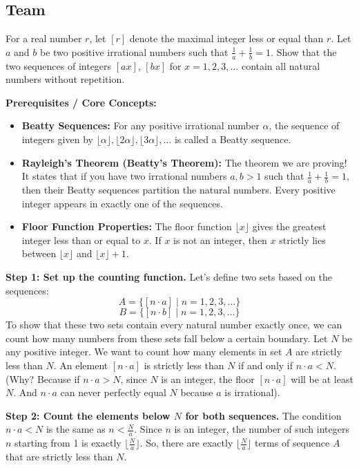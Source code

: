 \subsection*{Team}
\begin{exercise}
\label{algebra:2010:7}
For a real number $r$, let $[r]$ denote the maximal integer less or equal than $r$. Let $a$ and $b$ be two positive irrational numbers such that $\frac{1}{a} + \frac{1}{b} = 1$. Show that the two sequences of integers $[ax]$, $[bx]$ for $x = 1, 2, 3, \dots$ contain all natural numbers without repetition.
\end{exercise}

\begin{solution}
\textbf{Prerequisites / Core Concepts:}
\begin{itemize}
    \item \textbf{Beatty Sequences:} For any positive irrational number $\alpha$, the sequence of integers given by $\lfloor \alpha \rfloor, \lfloor 2\alpha \rfloor, \lfloor 3\alpha \rfloor, \dots$ is called a Beatty sequence.
    \item \textbf{Rayleigh's Theorem (Beatty's Theorem):} The theorem we are proving! It states that if you have two irrational numbers $a, b > 1$ such that $\frac{1}{a} + \frac{1}{b} = 1$, then their Beatty sequences partition the natural numbers. Every positive integer appears in exactly one of the sequences.
    \item \textbf{Floor Function Properties:} The floor function $\lfloor x \rfloor$ gives the greatest integer less than or equal to $x$. If $x$ is not an integer, then $x$ strictly lies between $\lfloor x \rfloor$ and $\lfloor x \rfloor + 1$.
\end{itemize}

\textbf{Step 1: Set up the counting function.}
Let's define two sets based on the sequences:
\[ A = \{ [n \cdot a] \mid n = 1, 2, 3, \dots \} \]
\[ B = \{ [n \cdot b] \mid n = 1, 2, 3, \dots \} \]
To show that these two sets contain every natural number exactly once, we can count how many numbers from these sets fall below a certain boundary.
Let $N$ be any positive integer. We want to count how many elements in set $A$ are strictly less than $N$.
An element $[n \cdot a]$ is strictly less than $N$ if and only if $n \cdot a < N$. (Why? Because if $n \cdot a > N$, since $N$ is an integer, the floor $[n \cdot a]$ will be at least $N$. And $n \cdot a$ can never perfectly equal $N$ because $a$ is irrational).

\textbf{Step 2: Count the elements below $N$ for both sequences.}
The condition $n \cdot a < N$ is the same as $n < \frac{N}{a}$.
Since $n$ is an integer, the number of such integers $n$ starting from 1 is exactly $\lfloor \frac{N}{a} \rfloor$.
So, there are exactly $\lfloor \frac{N}{a} \rfloor$ terms of sequence $A$ that are strictly less than $N$.


\end{solution}
